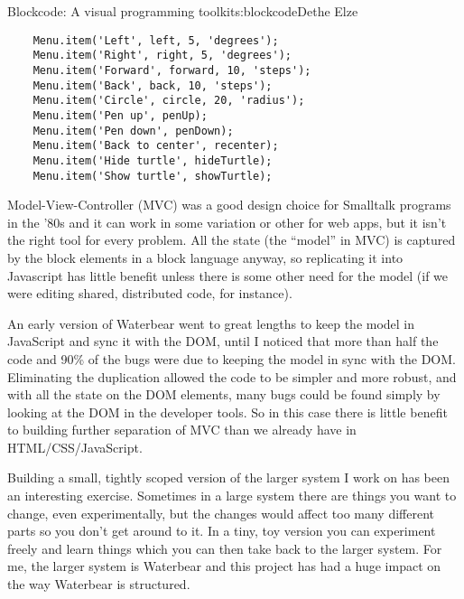 \begin{aosachapter}{Blockcode: A visual programming toolkit}{s:blockcode}{Dethe Elze}
\begin{verbatim}
    Menu.item('Left', left, 5, 'degrees');
    Menu.item('Right', right, 5, 'degrees');
    Menu.item('Forward', forward, 10, 'steps');
    Menu.item('Back', back, 10, 'steps');
    Menu.item('Circle', circle, 20, 'radius');
    Menu.item('Pen up', penUp);
    Menu.item('Pen down', penDown);
    Menu.item('Back to center', recenter);
    Menu.item('Hide turtle', hideTurtle);
    Menu.item('Show turtle', showTurtle);
\end{verbatim}

\label{lessons-learned}

\label{why-not-use-mvc}

Model-View-Controller (MVC) was a good design choice for Smalltalk
programs in the '80s and it can work in some variation or other for web
apps, but it isn't the right tool for every problem. All the state (the
``model'' in MVC) is captured by the block elements in a block language
anyway, so replicating it into Javascript has little benefit unless
there is some other need for the model (if we were editing shared,
distributed code, for instance).

An early version of Waterbear went to great lengths to keep the model in
JavaScript and sync it with the DOM, until I noticed that more than half
the code and 90\% of the bugs were due to keeping the model in sync with
the DOM. Eliminating the duplication allowed the code to be simpler and
more robust, and with all the state on the DOM elements, many bugs could
be found simply by looking at the DOM in the developer tools. So in this
case there is little benefit to building further separation of MVC than
we already have in HTML/CSS/JavaScript.

\label{toy-changes-can-lead-to-real-changes}

Building a small, tightly scoped version of the larger system I work on
has been an interesting exercise. Sometimes in a large system there are
things you want to change, even experimentally, but the changes would
affect too many different parts so you don't get around to it. In a
tiny, toy version you can experiment freely and learn things which you
can then take back to the larger system. For me, the larger system is
Waterbear and this project has had a huge impact on the way Waterbear is
structured.

\label{small-experiments-make-failure-ok}


\end{aosachapter}
